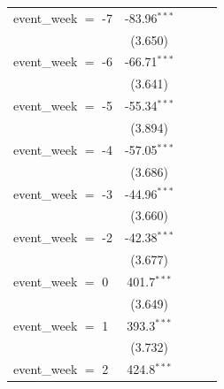 \begin{tabular}{lcccc}
   event\_week $=$ -7                                      & -83.96$^{***}$ &               &              &   \\   
                                                           & (3.650)        &               &              &   \\   
   event\_week $=$ -6                                      & -66.71$^{***}$ &               &              &   \\   
                                                           & (3.641)        &               &              &   \\   
   event\_week $=$ -5                                      & -55.34$^{***}$ &               &              &   \\   
                                                           & (3.894)        &               &              &   \\   
   event\_week $=$ -4                                      & -57.05$^{***}$ &               &              &   \\   
                                                           & (3.686)        &               &              &   \\   
   event\_week $=$ -3                                      & -44.96$^{***}$ &               &              &   \\   
                                                           & (3.660)        &               &              &   \\   
   event\_week $=$ -2                                      & -42.38$^{***}$ &               &              &   \\   
                                                           & (3.677)        &               &              &   \\   
   event\_week $=$ 0                                       & 401.7$^{***}$  &               &              &   \\   
                                                           & (3.649)        &               &              &   \\   
   event\_week $=$ 1                                       & 393.3$^{***}$  &               &              &   \\   
                                                           & (3.732)        &               &              &   \\   
   event\_week $=$ 2                                       & 424.8$^{***}$  &               &              &   \\   

\end{tabular}
